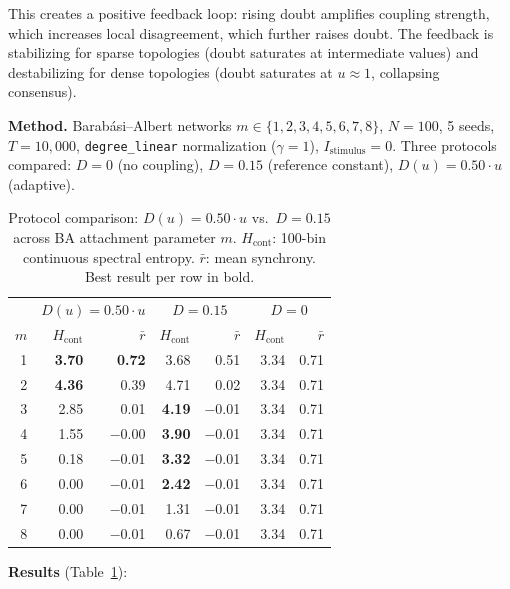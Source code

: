 ﻿\documentclass[11pt]{article}
\begin{document}
This creates a positive feedback loop: rising doubt amplifies coupling strength, which increases local disagreement, which further raises doubt. The feedback is stabilizing for sparse topologies (doubt saturates at intermediate values) and destabilizing for dense topologies (doubt saturates at $u \approx 1$, collapsing consensus).

\textbf{Method.} Barabási--Albert networks $m \in \{1, 2, 3, 4, 5, 6, 7, 8\}$, $N = 100$, 5 seeds, $T = 10{,}000$, \texttt{degree\_linear} normalization ($\gamma = 1$), $I_{\text{stimulus}} = 0$. Three protocols compared: $D = 0$ (no coupling), $D = 0.15$ (reference constant), $D(u) = 0.50 \cdot u$ (adaptive).

\begin{table}[ht]
\centering
\caption{Protocol comparison: $D(u) = 0.50 \cdot u$ vs.\ $D = 0.15$ across BA attachment parameter $m$. $H_{\text{cont}}$: 100-bin continuous spectral entropy. $\bar{r}$: mean synchrony. Best result per row in bold.}
\label{tab:adaptive_D_sweep}
\begin{tabular}{rrrrrrr}
\toprule
 & \multicolumn{2}{c}{$D(u) = 0.50 \cdot u$} & \multicolumn{2}{c}{$D = 0.15$} & \multicolumn{2}{c}{$D = 0$} \\
$m$ & $H_{\text{cont}}$ & $\bar{r}$ & $H_{\text{cont}}$ & $\bar{r}$ & $H_{\text{cont}}$ & $\bar{r}$ \\
\midrule
1 & \textbf{3.70} & \textbf{0.72} & 3.68 & 0.51 & 3.34 & 0.71 \\
2 & \textbf{4.36} & 0.39 & 4.71 & 0.02 & 3.34 & 0.71 \\
3 & 2.85 & 0.01 & \textbf{4.19} & $-$0.01 & 3.34 & 0.71 \\
4 & 1.55 & $-$0.00 & \textbf{3.90} & $-$0.01 & 3.34 & 0.71 \\
5 & 0.18 & $-$0.01 & \textbf{3.32} & $-$0.01 & 3.34 & 0.71 \\
6 & 0.00 & $-$0.01 & \textbf{2.42} & $-$0.01 & 3.34 & 0.71 \\
7 & 0.00 & $-$0.01 & 1.31 & $-$0.01 & 3.34 & 0.71 \\
8 & 0.00 & $-$0.01 & 0.67 & $-$0.01 & 3.34 & 0.71 \\
\bottomrule
\end{tabular}
\end{table}

\textbf{Results} (Table~\ref{tab:adaptive_D_sweep}):
\end{document}
